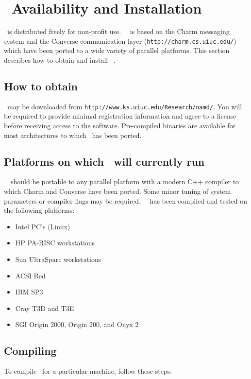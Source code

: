 \section{\NAMD\ Availability and Installation}
\label{section:avail}

\NAMD\ is distributed freely for non-profit use.
\NAMD\ \NAMDVER\ is based on the Charm messaging system and the
Converse communication layer ({\tt http://charm.cs.uiuc.edu/})
which have been ported to a wide variety of parallel platforms.
This section describes how to obtain and install \NAMD\ \NAMDVER.

\subsection{How to obtain \NAMD}

\NAMD\ may be downloaded from {\tt http://www.ks.uiuc.edu/Research/namd/}.
You will be required to provide minimal registration information and
agree to a license before receiving access to the software.
Pre-compiled binaries are available for most architectures to which
\NAMD\ has been ported.

\subsection{Platforms on which \NAMD\ will currently run}
\NAMD\ \NAMDVER\ should be portable to any parallel platform with a
modern C++ compiler to which Charm and Converse have been ported.
Some minor tuning of system parameters or compiler flags 
may be required.
\NAMD\ \NAMDVER\ has been compiled and tested on the following platforms:  
\begin{itemize}
\item Intel PC's (Linux)
\item HP PA-RISC workstations
\item Sun UltraSparc workstations
\item ACSI Red
\item IBM SP3
\item Cray T3D and T3E
\item SGI Origin 2000, Origin 200, and Onyx 2
\end{itemize}

\subsection{Compiling \NAMD}

To compile \NAMD\ for a particular machine, follow these steps:  

